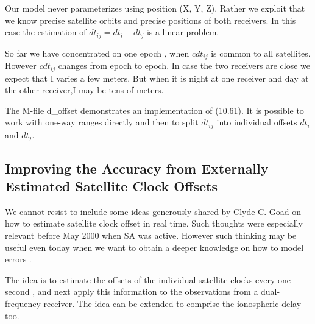 Our model never parameterizes using position (X, Y, Z). Rather we exploit that we know precise satellite orbits and precise positions of both receivers. In this case the estimation of $dt_{ij}=dt_{i}-dt_{j}$ is a linear problem.

So far we have concentrated on one epoch , when $cdt_{ij}$ is common to all satellites. However $cdt_{ij}$ changes from epoch to epoch. In case the two receivers are close we expect that I varies a few meters. But when it is night at one receiver and day at the other receiver,I may be tens of meters.

The M-file d\_offset demonstrates an implementation of (10.61). It is possible to work with one-way ranges directly and then to split $dt_{ij}$ into individual offsets $dt_{i}$ and $dt_{j}$.

\subsection{Improving the Accuracy from Externally Estimated Satellite Clock Offsets}

We cannot resist to include some ideas generously shared by Clyde C. Goad on how to
estimate satellite clock offset in real time. Such thoughts were especially relevant before
May 2000 when SA was active. However such thinking may be useful even today when
we want to obtain a deeper knowledge on how to model errors .

The idea is to estimate the offsets of the individual satellite clocks every one second ,
and next apply this information to the observations from a dual-frequency receiver. The
idea can be extended to comprise the ionospheric delay too.

